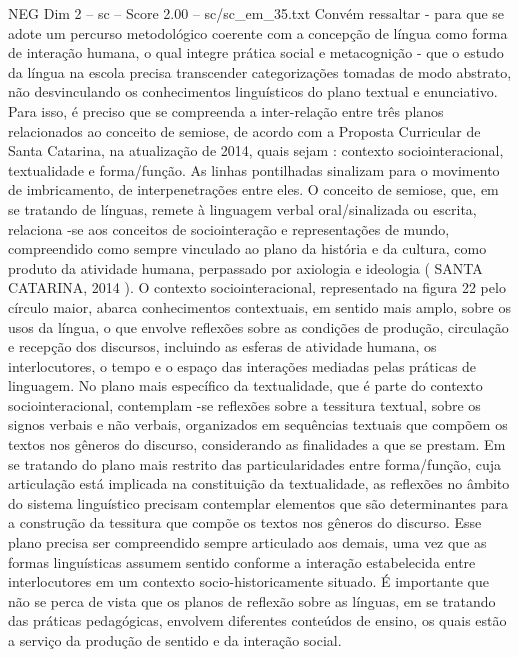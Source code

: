 \begin{textsample}{NEG Dim 2 – sc – Score 2.00 – sc/sc\_em\_35.txt}  \label{ex:f2_neg_278}
Convém ressaltar - para que se adote um percurso metodológico coerente com a concepção de língua como forma de interação humana, o qual integre prática social e metacognição - que o estudo da língua na escola precisa transcender categorizações tomadas de modo abstrato, não desvinculando os conhecimentos linguísticos do plano textual e enunciativo.
Para isso, é preciso que se compreenda a inter-relação entre três planos relacionados ao conceito de semiose, de acordo com a Proposta Curricular de Santa Catarina, na atualização de 2014, quais sejam : contexto sociointeracional, textualidade e forma/função.
As linhas pontilhadas sinalizam para o movimento de imbricamento, de interpenetrações entre eles.
O conceito de semiose, que, em se tratando de línguas, remete à linguagem verbal oral/sinalizada ou escrita, relaciona -se aos conceitos de sociointeração e representações de mundo, compreendido como sempre vinculado ao plano da história e da cultura, como produto da atividade humana, perpassado por axiologia e ideologia ( SANTA CATARINA, 2014 ).
O contexto sociointeracional, representado na figura 22 pelo círculo maior, abarca conhecimentos contextuais, em sentido mais amplo, sobre os usos da língua, o que envolve reflexões sobre as condições de produção, circulação e recepção dos discursos, incluindo as esferas de atividade humana, os interlocutores, o tempo e o espaço das interações mediadas pelas práticas de linguagem.
No plano mais específico da textualidade, que é parte do contexto sociointeracional, contemplam -se reflexões sobre a tessitura textual, sobre os signos verbais e não verbais, organizados em sequências textuais que compõem os textos nos gêneros do discurso, considerando as finalidades a que se prestam.
Em se tratando do plano mais restrito das particularidades entre forma/função, cuja articulação está implicada na constituição da textualidade, as reflexões no âmbito do sistema linguístico precisam contemplar elementos que são determinantes para a construção da tessitura que compõe os textos nos gêneros do discurso.
Esse plano precisa ser compreendido sempre articulado aos demais, uma vez que as formas linguísticas assumem sentido conforme a interação estabelecida entre interlocutores em um contexto socio-historicamente situado.
É importante que não se perca de vista que os planos de reflexão sobre as línguas, em se tratando das práticas pedagógicas, envolvem diferentes conteúdos de ensino, os quais estão a serviço da produção de sentido e da interação social.

\end{textsample}

